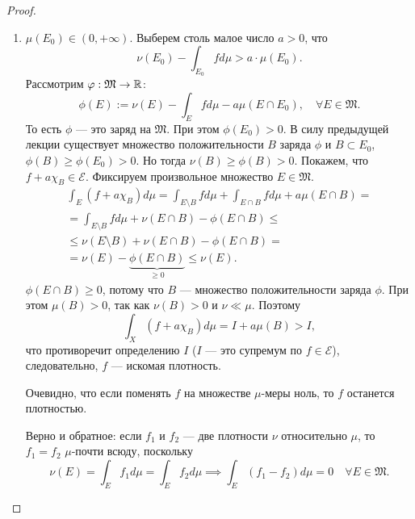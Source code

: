 \begin{proof}
\begin{enumerate}
\begin{equation}
        \nu(E_0) > \int_{E_0} f(x) d\mu(x). \label{eq:14.1}
    \end{equation}
    Очевидно, что $\mu(E_0) >0$ (поскольку иначе обе части неравенства были бы равны нулю).
    Кроме того, без ограничения общности можно считать, что мера $\mu(E_0) < +\infty$.
    Действительно, $\mu$ — $\sigma$-конечная мера.
    Если бы $\mu(E_0) = +\infty$, то 
    $$E_0 = \bigcup\limits_{n\in \N}E_n, \quad E_n \subset E_{n+1} \ \forall n \in \N$$
    \[\mu(E_n) < +\infty \quad \forall n \in \N,\]
    следовательно, по непрерывности меры снизу
    \[\nu(E_n) - \int_{E_n} fd\mu \to \nu(E_0) - \int_{E_0}f d\mu > 0,\]
    поэтому неравенство \eqref{eq:14.1} сохранится при замене $E_0$ на $E_n$ при всех достаточно больших $n \in \N$.
    \item $\mu(E_0) \in (0, +\infty)$. Выберем столь малое число $a > 0$, что
    \[\nu(E_0) - \int_{E_0}fd\mu > a \cdot \mu(E_0).\]
    Рассмотрим $\varphi: \mathfrak{M} \to \mathbb{R}$:
    \[\phi(E) := \nu(E) - \int_E fd\mu - a \mu(E \cap E_0), \quad \forall E \in \mathfrak{M}.\]
    То есть $\phi$ — это заряд на $\mathfrak{M}$.
    При этом $\phi(E_0)>0$.
    В силу предыдущей лекции существует множество положительности $B$ заряда $\phi$ и $B \subset E_0$, $\phi(B) \geqslant \phi(E_0) > 0$.
    Но тогда $\nu(B) \geqslant \phi(B) > 0$.
    Покажем, что $f + a \chi_B \in \mathcal{E}$.
    Фиксируем произвольное множество $E \in \mathfrak{M}$.
    \begin{multline*}
        \int_E (f + a \chi_B)d\mu = \int_{E \setminus B} fd\mu + \int_{E \cap B} fd\mu + a \mu(E \cap B)
        =\\=
        \int_{E \setminus B} fd\mu + \nu(E \cap B) - \phi(E \cap B)
        \leqslant\\\leqslant
        \nu(E \setminus B) + \nu(E \cap B) - \phi(E \cap B)
        =\\=
        \nu(E) - \underbrace{\phi(E \cap B)}_{\geqslant 0} \leqslant \nu(E).
    \end{multline*} 
    $\phi(E \cap B) \geqslant 0$, потому что $B$ — множество положительности заряда $\phi$.
    При этом $\mu(B) > 0$, так как $\nu(B) > 0$ и $\nu \ll \mu$.
    Поэтому\[\int_X (f + a \chi_B)d\mu = I + a \mu(B) > I,\]
    что противоречит определению $I$ ($I$ — это супремум по $f \in \mathcal{E}$), следовательно, $f$ — искомая плотность.

    Очевидно, что если поменять $f$ на множестве $\mu$-меры ноль, то $f$ останется плотностью.

    Верно и обратное: если $f_1$ и $f_2$ — две плотности $\nu$ относительно $\mu$, то $f_1 = f_2$ $\mu$-почти всюду, поскольку
    \[\nu(E) = \int_E f_1 d\mu = \int_E f_2 d\mu \implies \int_E (f_1 - f_2)d\mu = 0 \quad \forall E \in \mathfrak{M}.\]
\end{enumerate}
\end{proof} 

